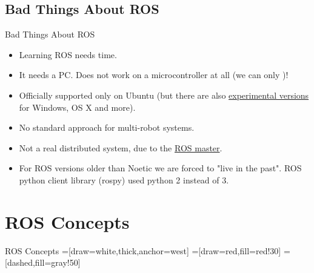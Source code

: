 \documentclass{beamer}
\begin{document}
\subsection{Bad Things About ROS}

\begin{frame}{Bad Things About ROS}
            \begin{itemize}
                \item Learning ROS needs time.
                \item It needs a PC. Does not work on a microcontroller at all (we can only  {})!
                \item Officially supported only on Ubuntu (but there are also {\color{blue}\href{http://wiki.ros.org/Installation}{experimental versions}} for Windows, OS X and more).
                \item No standard approach for multi-robot systems.
                \item Not a real distributed system, due to the {\color{blue}\href{https://roboticsbackend.com/ros1-vs-ros2-practical-overview/\#No_more_ROS_master}{ROS master}}.
                \item For ROS versions older than Noetic we are forced to "live in the past". ROS python client library (rospy) used python 2 instead of 3.
            \end{itemize}  
\end{frame}






\section{ROS Concepts}

\begin{frame}{ROS Concepts}
=[draw=white,thick,anchor=west]
=[draw=red,fill=red!30]
=[dashed,fill=gray!50]
\end{frame}
\end{document}
